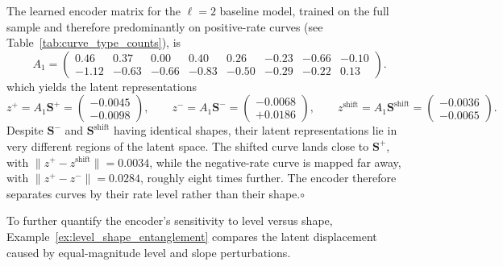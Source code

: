 \begin{example}
The learned encoder matrix for the $\ell=2$ baseline model, trained on the full sample and therefore predominantly on positive-rate curves (see Table~\ref{tab:curve_type_counts}), is
$$A_1 = \begin{pmatrix} 0.46 & 0.37 & 0.00 & 0.40 & 0.26 & -0.23 & -0.66 & -0.10 \\ 
-1.12 & -0.63 & -0.66 & -0.83 & -0.50 & -0.29 & -0.22 & 0.13 \end{pmatrix}.$$ 
which yields the latent representations
$$z^{+} = A_1\mathbf{S}^{+}=\begin{pmatrix} -0.0045 \\ -0.0098 \end{pmatrix}, \qquad
z^{-} = A_1\mathbf{S}^{-}=\begin{pmatrix} -0.0068 \\ +0.0186 \end{pmatrix}, \qquad
z^{\text{shift}} = A_1\mathbf{S}^{\text{shift}}=\begin{pmatrix} -0.0036 \\ -0.0065 \end{pmatrix}.$$
Despite $\mathbf{S}^{-}$ and $\mathbf{S}^{\text{shift}}$ having identical shapes, their latent representations lie in very different regions of the latent space. The shifted curve lands close to $\mathbf{S}^{+}$, with $\|z^{+} - z^{\text{shift}}\| = 0.0034$, while the negative-rate curve is mapped far away, with $\|z^{+} - z^{-}\| = 0.0284$, roughly eight times further. The encoder therefore separates curves by their rate level rather than their shape.\;\;$\circ$
\end{example}


To further quantify the encoder's sensitivity to level versus shape, Example~\ref{ex:level_shape_entanglement} compares the latent displacement caused by equal-magnitude level and slope perturbations.



